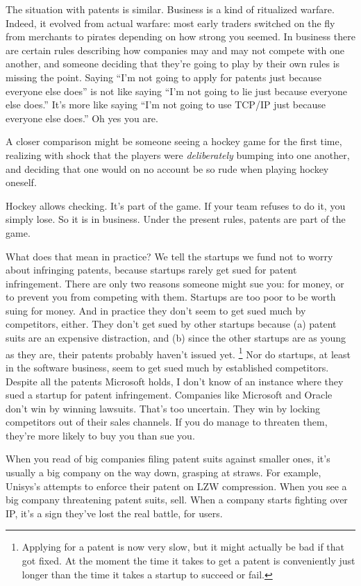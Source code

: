 \documentclass[12pt]{book}
\begin{document}
The situation with patents is similar. Business is a kind of ritualized
warfare. Indeed, it evolved from actual warfare: most early traders
switched on the fly from merchants to pirates depending on how strong
you seemed. In business there are certain rules describing how companies
may and may not compete with one another, and someone deciding that
they're going to play by their own rules is missing the point. Saying
``I'm not going to apply for patents just because everyone else does''
is not like saying ``I'm not going to lie just because everyone else
does.'' It's more like saying ``I'm not going to use TCP/IP just because
everyone else does.'' Oh yes you are.

A closer comparison might be someone seeing a hockey game for the first
time, realizing with shock that the players were \emph{deliberately}
bumping into one another, and deciding that one would on no account be
so rude when playing hockey oneself.

Hockey allows checking. It's part of the game. If your team refuses to
do it, you simply lose. So it is in business. Under the present rules,
patents are part of the game.

What does that mean in practice? We tell the startups we fund not to
worry about infringing patents, because startups rarely get sued for
patent infringement. There are only two reasons someone might sue you:
for money, or to prevent you from competing with them. Startups are too
poor to be worth suing for money. And in practice they don't seem to get
sued much by competitors, either. They don't get sued by other startups
because (a) patent suits are an expensive distraction, and (b) since the
other startups are as young as they are, their patents probably haven't
issued yet. \footnote{Applying for a patent is now very slow, but it might actually be
bad if that got fixed. At the moment the time it takes to get a patent
is conveniently just longer than the time it takes a startup to succeed
or fail.} Nor do startups, at least in the
software business, seem to get sued much by established competitors.
Despite all the patents Microsoft holds, I don't know of an instance
where they sued a startup for patent infringement. Companies like
Microsoft and Oracle don't win by winning lawsuits. That's too
uncertain. They win by locking competitors out of their sales channels.
If you do manage to threaten them, they're more likely to buy you than
sue you.

When you read of big companies filing patent suits against smaller ones,
it's usually a big company on the way down, grasping at straws. For
example, Unisys's attempts to enforce their patent on LZW compression.
When you see a big company threatening patent suits, sell. When a
company starts fighting over IP, it's a sign they've lost the real
battle, for users.
\end{document}
